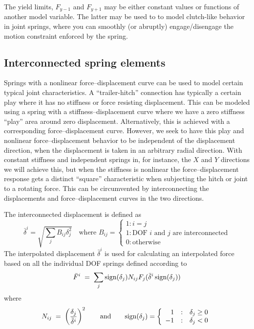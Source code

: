 The yield limits, $F_{y-1}$ and $F_{y+1}$ may be either constant values or
functions of another model variable.
The latter may be used to to model clutch-like behavior in joint springs,
where you can smoothly (or abruptly) engage/disengage the motion constraint
enforced by the spring.

\subsection{Interconnected spring elements}
\label{subs:Interconnected spring}

Springs with a nonlinear force--displacement curve can be used to model certain
typical joint characteristics.
A ``trailer-hitch'' connection has typically a certain play where it has no
stiffness or force resisting displacement.
This can be modeled using a spring with a stiffness--displacement curve where
we have a zero stiffness ``play'' area around zero displacement.
Alternatively, this is achieved with a corresponding force--displacement curve.
However, we seek to have this play and nonlinear force--displacement behavior
to be independent of the displacement direction, when the displacement is taken
in an arbitrary radial direction.
With constant stiffness and independent springs in, for instance, the $X$
and $Y$ directions we will achieve this, but when the stiffness is nonlinear
the force--displacement response gets a distinct ``square'' characteristic when
subjecting the hitch or joint to a rotating force.
This can be circumvented by interconnecting the displacements and
force--displacement curves in the two directions.

The interconnected displacement is defined as
%
\begin{equation}
\bar\delta^i = \sqrt{\sum_j B_{ij}\delta^2_j} \quad\text{where~} B_{ij} =
\left\{\begin{array}{l}
1 : i = j \\
1 : \text{DOF $i$ and $j$ are interconnected} \\
0 : \text{otherwise}
\end{array}\right.
\end{equation}
%
The interpolated displacement $\bar\delta^i$ is used for calculating an
interpolated force based on all the individual DOF springs defined according
to~
%
\begin{equation}
\bar F^i \;=\; \sum_j \text{sign}(\delta_j) N_{ij} F_j(\bar\delta^i\,\text{sign}(\delta_j))
\end{equation}
%
where
%
\begin{equation}
N_{ij} \;=\; \left(\frac{\delta_j}{\bar\delta^i}\right)^2 \qquad\text{and}\qquad
\text{sign}(\delta_j) = \left\{\begin{array}{rcl}
 1 &:& \delta_j \ge 0 \\
-1 &:& \delta_j < 0
\end{array}\right.
\label{eq:interpolation functions}
\end{equation}

